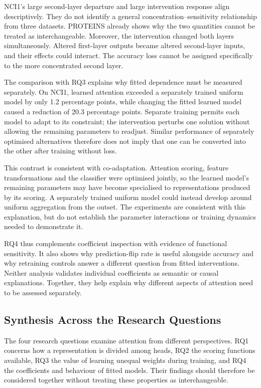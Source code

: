 \documentclass[11pt,a4paper]{article}
\begin{document}
NCI1's large second-layer departure and large intervention response align descriptively. They do not identify a general concentration--sensitivity relationship from three datasets. PROTEINS already shows why the two quantities cannot be treated as interchangeable. Moreover, the intervention changed both layers simultaneously. Altered first-layer outputs became altered second-layer inputs, and their effects could interact. The accuracy loss cannot be assigned specifically to the more concentrated second layer.

The comparison with RQ3 explains why fitted dependence must be measured separately. On NCI1, learned attention exceeded a separately trained uniform model by only 1.2 percentage points, while changing the fitted learned model caused a reduction of 20.3 percentage points. Separate training permits each model to adapt to its constraint; the intervention perturbs one solution without allowing the remaining parameters to readjust. Similar performance of separately optimised alternatives therefore does not imply that one can be converted into the other after training without loss.

This contrast is consistent with co-adaptation. Attention scoring, feature transformations and the classifier were optimised jointly, so the learned model's remaining parameters may have become specialised to representations produced by its scoring. A separately trained uniform model could instead develop around uniform aggregation from the outset. The experiments are consistent with this explanation, but do not establish the parameter interactions or training dynamics needed to demonstrate it.

RQ4 thus complements coefficient inspection with evidence of functional sensitivity. It also shows why prediction-flip rate is useful alongside accuracy and why retraining controls answer a different question from fitted interventions. Neither analysis validates individual coefficients as semantic or causal explanations. Together, they help explain why different aspects of attention need to be assessed separately.

\subsection{Synthesis Across the Research Questions}
\label{sec:synthesis}

The four research questions examine attention from different perspectives. RQ1 concerns how a representation is divided among heads, RQ2 the scoring functions available, RQ3 the value of learning unequal weights during training, and RQ4 the coefficients and behaviour of fitted models. Their findings should therefore be considered together without treating these properties as interchangeable.
\end{document}
